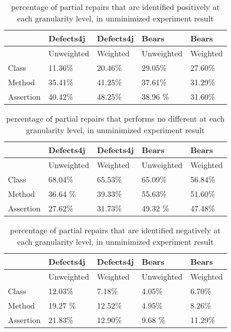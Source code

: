 \documentclass[sigconf, timestamp-false, anonymous=true]{acmart}
\begin{document}
\begin{table}
{\begin{center}
    \begin{tabular}{| l | l | l | l | l |} \hline
     & Defects4j & Defects4j & Bears & Bears  \\ \hline
     & Unweighted & Weighted &Unweighted& Weighted \\ \hline
    Class & 11.36\% & 20.46\% & 29.05\% & 27.60\%\\
    Method & 35.41\% & 41.25\% & 37.61\% & 31.29\% \\
    Assertion & 40.42\% & 48.25\% & 38.96 \% & 31.60\% \\
    \hline
    
    \end{tabular}
\end{center}}
\caption{percentage of partial repairs that are identified positively at each granularity level, in unminimized experiment result}
\end{table}

    
\begin{table}
{\begin{center}
    \begin{tabular}{| l | l | l | l | l |} \hline
     & Defects4j & Defects4j & Bears & Bears  \\ \hline
     & Unweighted & Weighted & Unweighted & Weighted \\ \hline
    Class & 68.04\% & 65.53\% & 65.09\% & 56.84\%\\
    Method & 36.64 \% & 39.33\% & 55.63\% & 51.60\% \\
    Assertion & 27.62\% & 31.73\% & 49.32 \% & 47.48\% \\
    \hline
    
    \end{tabular}
\end{center} }
\caption{percentage of partial repairs that performs no different at each granularity level, in unminimized experiment result}
\end{table}   
    
\begin{table}
{\begin{center}
    \begin{tabular}{| l | l | l | l | l |} \hline
     & Defects4j & Defects4j & Bears & Bears  \\ \hline
     & Unweighted & Weighted & Unweighted & Weighted \\ \hline
    Class & 12.03\% & 7.18\% & 4.05\% & 6.70\%\\
    Method & 19.27 \% & 12.52\% & 4.95\% & 8.26\% \\
    Assertion & 21.83\% & 12.90\% & 9.68 \% & 11.29\% \\
    \hline
    
    \end{tabular}
\end{center}}
\caption{percentage of partial repairs that are identified negatively at each granularity level, in unminimized experiment result}
\end{table}
    
\end{document}
